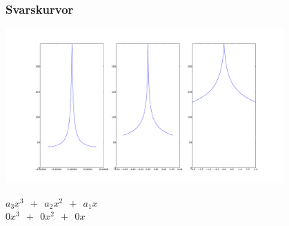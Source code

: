 \documentclass[]{beamer}
\begin{document}
\begin{frame}
 \frametitle{Svarskurvor}
  \begin{center}
    \includegraphics[width=0.8\textwidth]{response_curves.pdf}
  \end{center}
    \begin{center}
    $a_3x^3 ~~+~~ a_2x^2 ~~+~~ a_1x$\\
    $0x^3 ~~+~~ 0x^2 ~~+~~ 0x$
    \end{center}
\end{frame}
\end{document}

